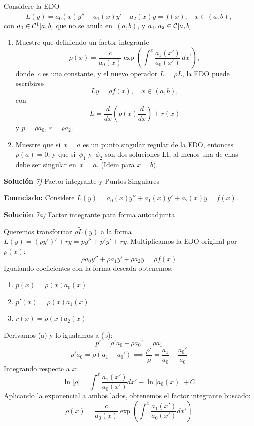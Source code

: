 \documentclass[11pt,spanish]{article}
\newcommand{\tder}[2]{\frac{d #1}{d #2}}
\newcounter{problema}
\newcommand{\prob}{\stepcounter{problema} \vspace{.5cm} \noindent{\bf Problema \arabic{problema}: }}
\begin{document}
\prob Considere la EDO
\[
\tilde{L}(y) = a_0(x)y'' + a_1(x) y' + a_2(x) y = f(x), \quad x\in (a,b),
\]
con $a_0\in{\cal C}^1[a,b]$ que no se anula en~$(a,b)$, y $a_1,a_2\in{\cal C}[a,b]$.
\begin{enumerate}
\item Muestre que definiendo un factor integrante
\[
\rho(x) = \frac{c}{a_0(x)} 
\exp\left(
\int^x \frac{a_1(x')}{a_0(x')}\,dx'
\right),
\]
donde~$c$ es una constante, y el nuevo operador $L=\rho\tilde{L}$, la EDO puede escribirse
\[
Ly = \rho f(x), \quad x\in (a,b),
\]
con
\[
L = \tder{}{x}\left( p(x)\tder{}{x} \right) + r(x)
\]
y $p=\rho a_0$, $r=\rho a_2$.
\item Muestre que si~$x=a$ es un punto singular regular de la EDO, entonces $p(a)=0$, y que si~$\phi_1$ y~$\phi_2$ son dos soluciones LI, al menos una de ellas debe ser singular en~$x=a$. (Idem para $x=b$).
\end{enumerate}



\vspace{0.5cm}
{\bf Soluci\'on }{\em 7)}
Factor integrante y Puntos Singulares
\vspace{0.5cm}

{\bf Enunciado:} Considere $\tilde{L}(y) = a_0(x)y'' + a_1(x) y' + a_2(x) y = f(x)$.

\vspace{0.5cm}
{\bf Soluci\'on }{\em 7a)}
Factor integrante para forma autoadjunta
\vspace{0.5cm}
 
Queremos transformar $\rho \tilde{L}(y)$ a la forma $L(y) = (p y')' + r y = p y'' + p' y' + r y$.
Multiplicamos la EDO original por $\rho(x)$:
$$\rho a_0 y'' + \rho a_1 y' + \rho a_2 y = \rho f(x)$$
Igualando coeficientes con la forma deseada obtenemos:
\begin{enumerate}
\item $p(x) = \rho(x) a_0(x)$
\item $p'(x) = \rho(x) a_1(x)$
\item $r(x) = \rho(x) a_2(x)$
\end{enumerate}
Derivamos (a) y lo igualamos a (b):
$$p' = \rho' a_0 + \rho a_0' = \rho a_1$$
$$\rho' a_0 = \rho(a_1 - a_0') \implies \frac{\rho'}{\rho} = \frac{a_1}{a_0} - \frac{a_0'}{a_0}$$
Integrando respecto a $x$:
$$\ln|\rho| = \int^x \frac{a_1(x')}{a_0(x')} dx' - \ln|a_0(x)| + C$$
Aplicando la exponencial a ambos lados, obtenemos el factor integrante buscado:
$$\rho(x) = \frac{c}{a_0(x)} \exp\left( \int^x \frac{a_1(x')}{a_0(x')} dx' \right)$$
\end{document}
